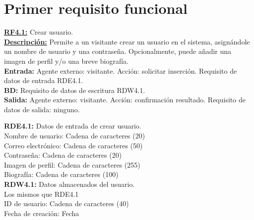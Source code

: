 
\section{Primer requisito funcional}
\textbf{\textcolor{rojo}{\underline{RF4.1:}}} Crear usuario. \\

\textbf{\textcolor{rojo}{\underline{Descripción:}}} Permite a un visitante crear un usuario en el sistema, asignándole un nombre de usuario y una contraseña.
Opcionalmente, puede añadir una imagen de perfil y/o una breve biografía. \\

\textbf{\textcolor{rojo}{Entrada:}} Agente externo: visitante. Acción: solicitar inserción.
Requisito de datos de entrada \textcolor{azul}{RDE4.1}.\\ 
\textbf{\textcolor{rojo}{BD:}} Requisito de datos de escritura \textcolor{azul}{RDW4.1}. \\

\textbf{\textcolor{rojo}{Salida:}} Agente externo: visitante. Acción: confirmación resultado.
Requisito de datos de salida: ninguno.


\textcolor{azul}{\textbf{RDE4.1:}} Datos de entrada de crear usuario. \\
\hspace*{1cm} Nombre de usuario: Cadena de caracteres (20)\\
\hspace*{1cm} Correo electrónico: Cadena de caracteres (50)\\
\hspace*{1cm} Contraseña: Cadena de caracteres (20)\\
\hspace*{1cm} Imagen de perfil: Cadena de caracteres (255)\\
\hspace*{1cm} Biografía: Cadena de caracteres (100) \\

\textcolor{azul}{\textbf{RDW4.1:}} Datos almacenados del usuario. \\
\hspace*{1cm} Los mismos que RDE4.1 \\
\hspace*{1cm} ID de usuario: Cadena de caracteres (40) \\
\hspace*{1cm} Fecha de creación: Fecha \\



